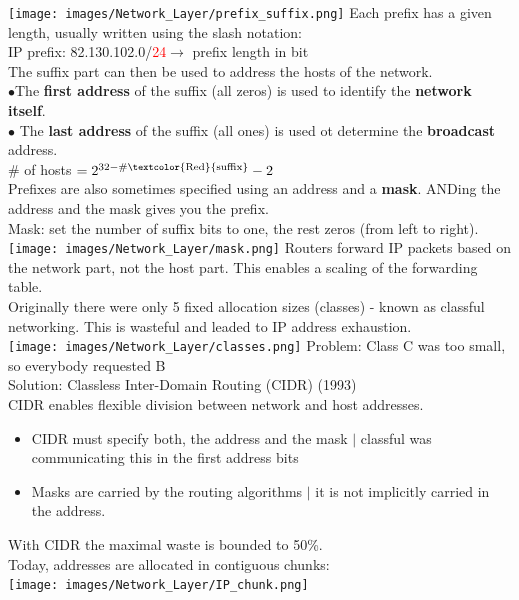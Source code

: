 \documentclass[a4paper, fontsize=8pt, landscape, DIV=1]{scrartcl}
\begin{document}
\begin{multicols*}{4}
		\texttt{[image: images/Network\_Layer/prefix\_suffix.png]}
		Each prefix has a given length, usually written using the slash notation:\\
		IP prefix: 82.130.102.0/\textcolor{Red}{24}$\rightarrow$ prefix length in
		bit\\
		The suffix part can then be used to address the hosts of the network.\\
		$\bullet$The \textbf{first address} of the suffix (all zeros) is used to
		identify the \textbf{network itself}.\\
		$\bullet$ The \textbf{last address} of the suffix (all ones) is used ot
		determine the \textbf{broadcast} address.\\
		\# of hosts $= 2^{32-\#\mathrm{\textcolor{Red}{suffix}}}-2$\\
		Prefixes are also sometimes specified using an address and a \textbf{mask}.
		ANDing the address and the mask gives you the prefix. \\
		Mask: set the number of suffix bits to one, the rest zeros (from left to
		right).\\
		\texttt{[image: images/Network\_Layer/mask.png]}
		Routers forward IP packets based on the network part, not the host part.
		This enables a scaling of the forwarding table. \\
		Originally there were only 5 fixed allocation sizes (classes) - known as
		classful networking. This is wasteful and leaded to IP address exhaustion.\\
		\texttt{[image: images/Network\_Layer/classes.png]}
		Problem: Class C was too small, so everybody requested B\\
		Solution: Classless Inter-Domain Routing (CIDR) (1993)\\
		CIDR enables flexible division between network and host addresses. 
		\begin{itemize}[noitemsep]
			\item CIDR must specify both, the address and the mask $\vert$ classful
			was communicating this in the first address bits
			\item Masks are carried by the routing algorithms $\vert$ it is not
			implicitly carried in the address.  
		\end{itemize}
		With CIDR the maximal waste is bounded to 50\%.\\
		Today, addresses are allocated in contiguous chunks:\\ 
		\texttt{[image: images/Network\_Layer/IP\_chunk.png]}
		\pagebreak
		

\end{multicols*}
\end{document}
